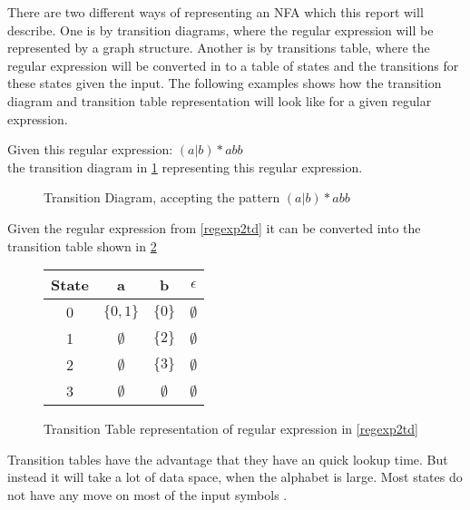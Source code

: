 There are two different ways of representing an NFA which this report will
describe. One is by transition diagrams, where the regular expression will be
represented by a graph structure. Another is by transitions table, where the 
regular expression will be converted in to a table of states and the 
transitions for these states given the input. The following examples shows how 
the transition diagram and transition table representation will look like for a 
given regular expression.

\begin{example} \label{regexp2td}
Given this regular expression: $(a | b)* abb$ \\
the transition diagram in \cref{fig:td} representing this regular expression.
\end{example}
\begin{figure}[h!]
  \centering
  \caption{Transition Diagram, accepting the pattern  $(a | b)* abb$ 
  \label{fig:td}}
  \end{figure}

\begin{example} \label{regexp2tt}
Given the regular expression from \cref{regexp2td} it can be converted into the transition table shown in \cref{fig:tt}
\end{example}
\begin{figure}[h!]
  \centering
  \begin{tabular}{| c | c c c |}
    \hline
    \hline
    State & a & b & $\epsilon$\\
    \hline
    0 & $\{0, 1\}$ & $\{0\}$ & $\emptyset$ \\
    1 & $\emptyset$ & $\{2\}$ & $\emptyset$ \\
    2 & $\emptyset$ & $\{3\}$ & $\emptyset$ \\
    3 & $\emptyset$ & $\emptyset$ & $\emptyset$ \\
    \hline
  \end{tabular}
  \caption{Transition Table representation of regular expression in 
        \cref{regexp2td} \label{fig:tt}}
\end{figure}
Transition tables have the advantage that they have an quick lookup time. But 
instead it will take a lot of data space, when the alphabet is large. Most 
states do not have any move on most of the input symbols \cite{Aho2006}.
